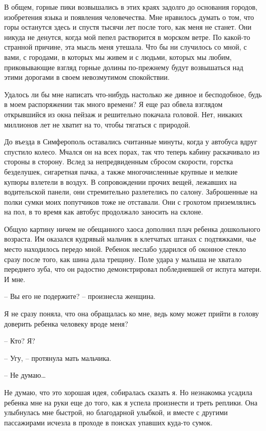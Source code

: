 \documentclass[
]{book}
\begin{document}
В общем, горные пики возвышались в этих краях задолго до основания городов, изобретения языка и появления человечества. Мне нравилось думать о том, что горы останутся здесь и спустя тысячи лет после того, как меня не станет. Они никуда не денутся, когда мой пепел растворится в морском ветре. По какой-то странной причине, эта мысль меня утешала. Что бы ни случилось со мной, с вами, с городами, в которых мы живем и с людьми, которых мы любим, приковывающие взгляд горные долины по-прежнему будут возвышаться над этими дорогами в своем невозмутимом спокойствии.

Удалось ли бы мне написать что-нибудь настолько же дивное и бесподобное, будь в моем распоряжении так много времени? Я еще раз обвела взглядом открывшийся из окна пейзаж и решительно покачала головой. Нет, никаких миллионов лет не хватит на то, чтобы тягаться с природой.

До въезда в Симферополь оставались считанные минуты, когда у автобуса вдруг спустило колесо. Мчался он на всех порах, так что теперь кабину раскачивало из стороны в сторону. Вслед за непредвиденным сбросом скорости, горстка безделушек, сигаретная пачка, а также многочисленные крупные и мелкие купюры взлетели в воздух. В сопровождении прочих вещей, лежавших на водительской панели, они стремительно разлетелись по салону. Заброшенные на полки сумки моих попутчиков тоже не отставали. Они с грохотом приземлялись на пол, в то время как автобус продолжало заносить на склоне.

Общую картину ничем не обещанного хаоса дополнил плач ребенка дошкольного возраста. Им оказался кудрявый мальчик в клетчатых штанах с подтяжками, чье место находилось передо мной. Ребенок неслабо ударился об оконное стекло сразу после того, как шина дала трещину. Поле удара у малыша не хватало переднего зуба, что он радостно демонстрировал побледневшей от испуга матери. И мне.

-- Вы его не подержите? -- произнесла женщина.

Я не сразу поняла, что она обращалась ко мне, ведь кому может прийти в голову доверить ребенка человеку вроде меня?

-- Кто? Я?

-- Угу, -- протянула мать мальчика.

-- Не думаю\ldots{}

Не думаю, что это хорошая идея, собиралась сказать я. Но незнакомка усадила ребенка мне на руки еще до того, как я успела произнести и треть реплики. Она улыбнулась мне быстрой, но благодарной улыбкой, и вместе с другими пассажирами исчезла в проходе в поисках упавших куда-то сумок.
\end{document}
